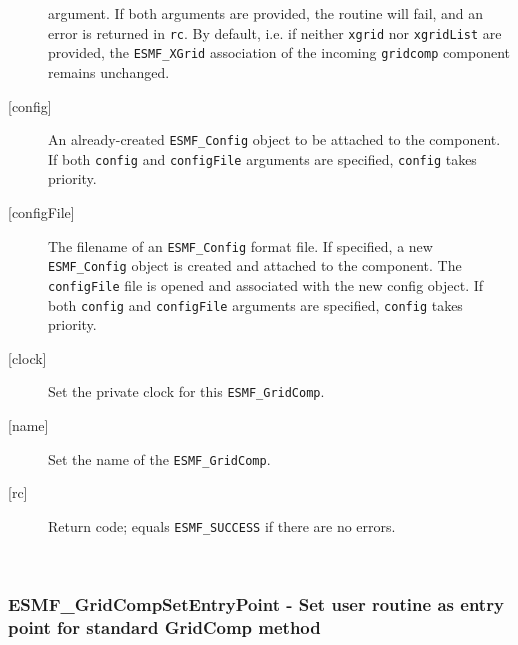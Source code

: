 \begin{description}
     argument. If both arguments are provided, the routine will fail, and an
     error is returned in {\tt rc}.
     By default, i.e. if neither {\tt xgrid} nor {\tt xgridList} are provided,
     the {\tt ESMF\_XGrid} association of the incoming {\tt gridcomp}
     component remains unchanged.
   \item[{[config]}]
     An already-created {\tt ESMF\_Config} object to be attached to the
     component.
     If both {\tt config} and {\tt configFile} arguments are specified,
     {\tt config} takes priority.
   \item[{[configFile]}]
     The filename of an {\tt ESMF\_Config} format file.
     If specified, a new {\tt ESMF\_Config} object is created and attached to the
     component. The {\tt configFile} file is opened and associated
     with the new config object.
     If both {\tt config} and {\tt configFile} arguments are specified,
     {\tt config} takes priority.
   \item[{[clock]}]
     Set the private clock for this {\tt ESMF\_GridComp}.
   \item[{[name]}]
     Set the name of the {\tt ESMF\_GridComp}.
   \item[{[rc]}]
     Return code; equals {\tt ESMF\_SUCCESS} if there are no errors.
   \end{description}
   
 
\mbox{}\hrulefill\ 
 
\subsubsection [ESMF\_GridCompSetEntryPoint] {ESMF\_GridCompSetEntryPoint - Set user routine as entry point for standard GridComp method}


